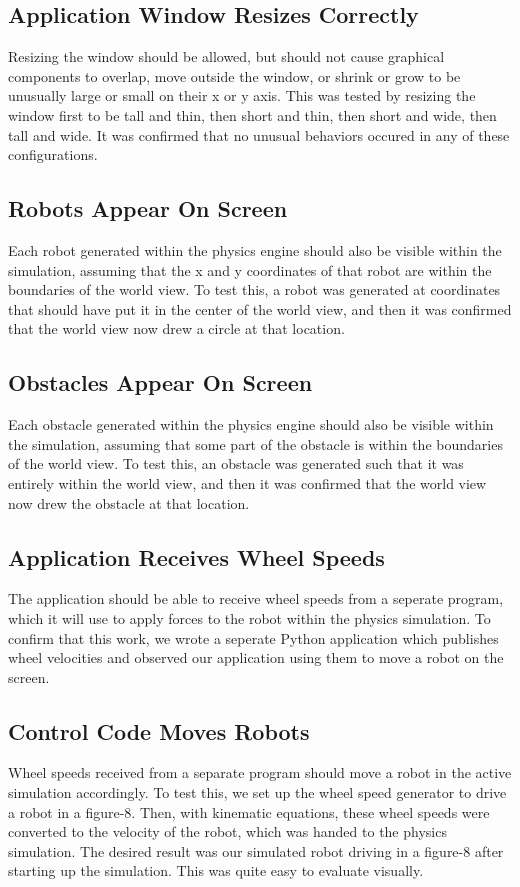 \subsection{Application Window Resizes Correctly}
Resizing the window should be allowed, but should not cause graphical components to overlap, move outside the window, or shrink or grow to be unusually large or small on their x or y axis. This was tested by resizing the window first to be tall and thin, then short and thin, then short and wide, then tall and wide. It was confirmed that no unusual behaviors occured in any of these configurations.

\subsection{Robots Appear On Screen}
Each robot generated within the physics engine should also be visible within the simulation, assuming that the x and y coordinates of that robot are within the boundaries of the world view. To test this, a robot was generated at coordinates that should have put it in the center of the world view, and then it was confirmed that the world view now drew a circle at that location.

\subsection{Obstacles Appear On Screen}
Each obstacle generated within the physics engine should also be visible within the simulation, assuming that some part of the obstacle is within the boundaries of the world view. To test this, an obstacle was generated such that it was entirely within the world view, and then it was confirmed that the world view now drew the obstacle at that location.

\subsection{Application Receives Wheel Speeds}
The application should be able to receive wheel speeds from a seperate program, which it will use to apply forces to the robot within the physics simulation. To confirm that this work, we wrote a seperate Python application which publishes wheel velocities and observed our application using them to move a robot on the screen.

\subsection{Control Code Moves Robots}
Wheel speeds received from a separate program should move a robot in the active simulation accordingly. To test this, we set up the wheel speed generator to drive a robot in a figure-8. Then, with kinematic equations, these wheel speeds were converted to the velocity of the robot, which was handed to the physics simulation. The desired result was our simulated robot driving in a figure-8 after starting up the simulation. This was quite easy to evaluate visually.

